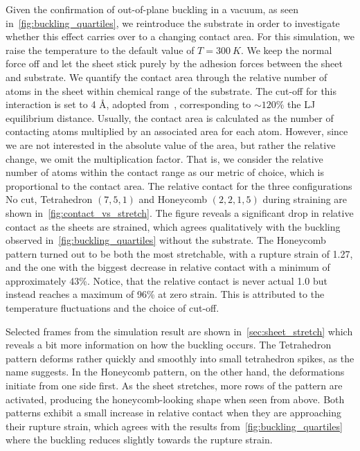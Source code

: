 Given the confirmation of out-of-plane buckling in a vacuum, as seen
in~\cref{fig:buckling_quartiles}, we reintroduce the substrate in order to
investigate whether this effect carries over to a changing contact area. For
this simulation, we raise the temperature to the default value of $T
=\SI{300}{K}$. We keep the normal force off and let the sheet stick purely by
the adhesion forces between the sheet and substrate. We quantify the contact
area through the relative number of atoms in the sheet within chemical range of
the substrate. The cut-off for this interaction is set to 4 Å, adopted
from~\cite{li_evolving_2016}, corresponding to $\sim 120\%$ the \acrshort{LJ}
equilibrium distance. Usually, the contact area is calculated as the number of
contacting atoms multiplied by an associated area for each atom. However, since
we are not interested in the absolute value of the area, but rather the relative
change, we omit the multiplication factor. That is, we consider the relative
number of atoms within the contact range as our metric of choice, which is
proportional to the contact area. The relative contact for the three
configurations No cut, Tetrahedron $(7,5,1)$ and Honeycomb $(2,2,1,5)$ during
straining are shown in~\cref{fig:contact_vs_stretch}. The figure reveals
a significant drop in relative contact as the sheets are strained, which agrees
qualitatively with the buckling observed in~\cref{fig:buckling_quartiles}
without the substrate. The Honeycomb pattern turned out to be both the most
stretchable, with a rupture strain of 1.27, and the one with the biggest
decrease in relative contact with a minimum of approximately 43\%. Notice, that
the relative contact is never actual 1.0 but instead reaches a maximum of 96\%
at zero strain. This is attributed to the temperature fluctuations and the
choice of cut-off. 

Selected frames from the simulation result are shown in~\cref{sec:sheet_stretch}
which reveals a bit more information on how the buckling occurs. The Tetrahedron pattern deforms rather quickly and smoothly into small tetrahedron
spikes, as the name suggests. In the Honeycomb pattern, on the other hand, the
deformations initiate from one side first. As the sheet stretches, more rows of
the pattern are activated, producing the honeycomb-looking shape when seen from
above. Both patterns exhibit a small increase in relative contact when they
are approaching their rupture strain, which agrees with the results from~\cref{fig:buckling_quartiles} where the buckling reduces slightly towards the
rupture strain.


